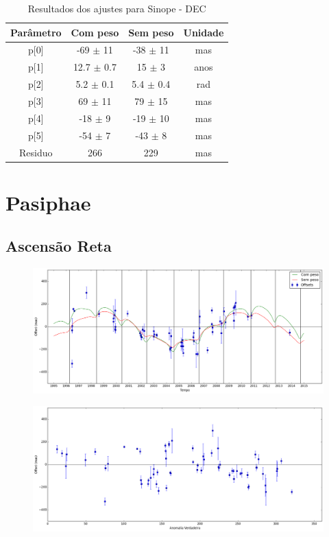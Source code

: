 \documentclass[11pt,a4paper]{report}
\begin{document}
\begin{table}[h!]
\caption{\label{Tab: Sinope-DEC} Resultados dos ajustes para Sinope - DEC}
\begin{centering}
\begin{tabular}{cccc}
\hline
\hline
Parâmetro & Com peso & Sem peso & Unidade\tabularnewline
\hline
p[0] & -69 $\pm$ 11 & -38 $\pm$ 11 & mas\\
p[1] & 12.7 $\pm$ 0.7 & 15 $\pm$ 3 & anos\\
p[2] & 5.2 $\pm$ 0.1 & 5.4 $\pm$ 0.4 & rad\\
p[3] & 69 $\pm$ 11 & 79 $\pm$ 15 & mas\\
p[4] & -18 $\pm$ 9 & -19 $\pm$ 10 & mas\\
p[5] & -54 $\pm$ 7 & -43 $\pm$ 8 & mas\\
Residuo & 266 & 229 & mas\\
\hline 
\end{tabular} 
\par\end{centering}
\end{table}

\chapter*{Pasiphae}
\section*{Ascensão Reta}

\begin{figure}[h]
\includegraphics[scale=0.35]{Pasiphae/RA.png} 
\end{figure}

\begin{figure}[h]
\includegraphics[scale=0.35]{Pasiphae/RA_anom.png}  
\end{figure}
\end{document}
